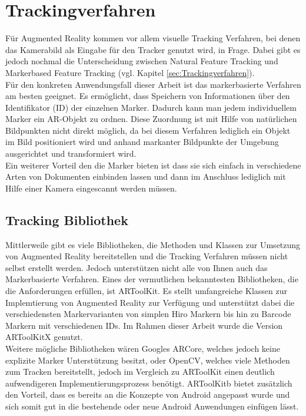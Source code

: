 \section{Trackingverfahren}
Für Augmented Reality kommen vor allem visuelle Tracking Verfahren, bei denen das Kamerabild als Eingabe für den Tracker genutzt wird, in Frage. Dabei gibt es jedoch nochmal die Unterscheidung zwischen Natural Feature Tracking und Markerbased Feature Tracking (vgl. Kapitel \ref{sec:Trackingverfahren}). \\ 
Für den konkreten Anwendungsfall dieser Arbeit ist das markerbasierte Verfahren am besten geeignet. Es ermöglicht, dass Speichern von Informationen über den Identifikator (ID) der einzelnen Marker. Dadurch kann man jedem individuellem Marker ein AR-Objekt zu ordnen. Diese Zuordnung ist mit Hilfe von natürlichen Bildpunkten nicht direkt möglich, da bei diesem Verfahren lediglich ein Objekt im Bild positioniert wird und anhand markanter Bildpunkte der Umgebung ausgerichtet und transformiert wird. \\
Ein weiterer Vorteil den die Marker bieten ist dass sie sich einfach in verschiedene Arten von Dokumenten einbinden lassen und dann im Anschluss lediglich mit Hilfe einer Kamera eingescannt werden müssen. 

\subsection{Tracking Bibliothek}
Mittlerweile gibt es viele Bibliotheken, die Methoden und Klassen zur Umsetzung von Augmented Reality bereitstellen und die Tracking Verfahren müssen nicht selbst erstellt werden. Jedoch unterstützen nicht alle von Ihnen auch das Markerbasierte Verfahren. Eines der vermutlichen bekanntesten Bibliotheken, die die Anforderungen erfüllen, ist ARToolKit. Es stellt umfangreiche Klassen zur Implemtierung von Augmented Reality zur Verfügung und unterstützt dabei die verschiedensten Markervarianten von simplen Hiro Markern bis hin zu Barcode Markern mit verschiedenen IDs.
Im Rahmen dieser Arbeit wurde die Version ARToolKitX genutzt. \\
Weitere mögliche Bibliotheken wären Googles ARCore, welches jedoch keine explizite Marker Unterstützung besitzt, oder OpenCV, welches viele Methoden zum Tracken bereitstellt, jedoch im Vergleich zu ARToolKit einen deutlich aufwendigeren Implementierungsprozess benötigt. ARToolKitb bietet zusätzlich den Vorteil, dass es bereits an die Konzepte von Android angepasst wurde und sich somit gut in die bestehende oder neue Android Anwendungen einfügen lässt.

